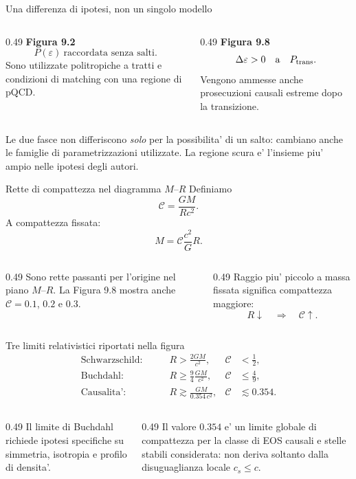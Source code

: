 \begin{frame}{Una differenza di ipotesi, non un singolo modello}
\small
\begin{columns}[T,onlytextwidth]
\begin{column}{0.49\textwidth}
\textbf{Figura 9.2}
\[
P(\varepsilon)\ \text{raccordata senza salti}.
\]
Sono utilizzate politropiche a tratti e condizioni di matching con una regione di pQCD.
\end{column}
\begin{column}{0.49\textwidth}
\textbf{Figura 9.8}
\[
\Delta\varepsilon>0
\quad\text{a}\quad P_{\rm trans}.
\]
Vengono ammesse anche prosecuzioni causali estreme dopo la transizione.
\end{column}
\end{columns}
\medskip
Le due fasce non differiscono \emph{solo} per la possibilita' di un salto: cambiano anche le famiglie di parametrizzazioni utilizzate. La regione scura e' l'insieme piu' ampio nelle ipotesi degli autori.
\end{frame}

\begin{frame}{Rette di compattezza nel diagramma $M$--$R$}
\small
Definiamo
\[
\mathcal C=\frac{GM}{Rc^2}.
\]
A compattezza fissata:
\[
M=\mathcal C\frac{c^2}{G}R.
\]
\begin{columns}[T,onlytextwidth]
\begin{column}{0.49\textwidth}
Sono rette passanti per l'origine nel piano $M$--$R$.
\medskip
La Figura 9.8 mostra anche $\mathcal C=0.1$, $0.2$ e $0.3$.
\end{column}
\begin{column}{0.49\textwidth}
Raggio piu' piccolo a massa fissata significa compattezza maggiore:
\[
R\downarrow\quad\Longrightarrow\quad\mathcal C\uparrow.
\]
\end{column}
\end{columns}
\end{frame}

\begin{frame}{Tre limiti relativistici riportati nella figura}
\small
\begin{align*}
\text{Schwarzschild:}&\qquad
R>\frac{2GM}{c^2},&\mathcal C&<\frac12,\\[1mm]
\text{Buchdahl:}&\qquad
R\geq\frac94\frac{GM}{c^2},&\mathcal C&\leq\frac49,\\[1mm]
\text{Causalita':}&\qquad
R\gtrsim\frac{GM}{0.354\,c^2},&\mathcal C&\lesssim0.354.
\end{align*}
\medskip
\begin{columns}[T,onlytextwidth]
\begin{column}{0.49\textwidth}
Il limite di Buchdahl richiede ipotesi specifiche su simmetria, isotropia e profilo di densita'.
\end{column}
\begin{column}{0.49\textwidth}
Il valore $0.354$ e' un limite globale di compattezza per la classe di EOS causali e stelle stabili considerata: non deriva soltanto dalla disuguaglianza locale $c_s\leq c$.
\end{column}
\end{columns}
\end{frame}

